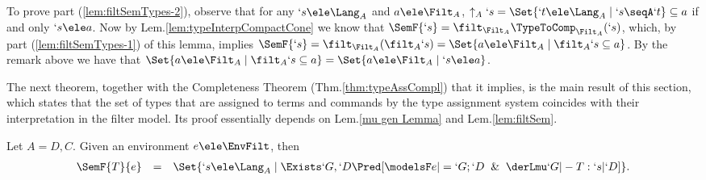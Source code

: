 \documentclass{CSML}
\begin{document}
\begin{Proof}
\begin{description}
 \end{description}

To prove part (\ref{lem:filtSemTypes-2}), observe that for any $`s\ele \Lang_A$ and $a \ele \Filt_A$, $\uparrow_A`s = \Set{`t \ele \Lang_A \mid `s\seqA`t} \subseteq a$ if and only $`s\ele a$. 
Now by Lem.\skp\ref{lem:typeInterpCompactCone} we know that $\SemF {`s} = \filt_{\Filt_A} \TypeToComp_{\Filt_A}(`s)$, which, by part (\ref{lem:filtSemTypes-1}) of this
lemma, implies $\SemF {`s} = \filt_{\Filt_A}(\filt_A `s) = \Set{a \ele \Filt_A \mid \filt_A `s \subseteq a}$. 
By the remark above we have that $\Set{a \ele \Filt_A \mid \filt_A `s \subseteq a} = \Set{a \ele \Filt_A \mid `s \ele a}$. %
 \end{Proof}

The next theorem, together with the Completeness Theorem (Thm.\skp\ref{thm:typeAssCompl}) that it implies, is the main result of this section, which states that the set of types that are assigned to terms and commands by the type assignment system coincides with their interpretation in the filter model.
Its proof essentially depends on Lem.\skp\ref{mu gen Lemma} and Lem.\skp\ref{lem:filtSem}.

 \begin{thm} \label{thm:filter-term interpretation}
Let $A = D,C$.
Given an environment $e \ele \EnvFilt$, then
%
 \[ \begin{array}{rcl}
	\SemF { T}{ e } &=& \Set{`s \ele \Lang_A \mid \Exists`G,`D \Pred [{ \modelsF e |= `G;`D \And \derLmu `G |- T : `s | `D }] }.
 \end{array} \]
 \end{thm}
\end{document}
